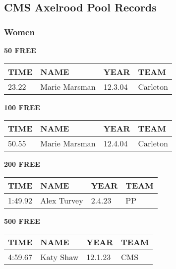 \vspace{0.4cm}

\newpage

\subsection{CMS Axelrood Pool Records}
\subsubsection{Women}

\begin{minipage}[t]{0.48\textwidth}
\centering
\textbf{50 FREE}\\[0.05cm]
\begin{tabular}{@{}p{1.8cm}p{2.8cm}p{1.2cm}p{1.4cm}@{}}
\hline
\textbf{TIME} & \textbf{NAME} & \textbf{YEAR} & \textbf{TEAM} \\
\hline
23.22 & Marie Marsman & 12.3.04 & Carleton \\
\hline
\end{tabular}
\end{minipage}\hfill
\begin{minipage}[t]{0.48\textwidth}
\centering
\textbf{100 FREE}\\[0.05cm]
\begin{tabular}{@{}p{1.8cm}p{2.8cm}p{1.2cm}p{1.4cm}@{}}
\hline
\textbf{TIME} & \textbf{NAME} & \textbf{YEAR} & \textbf{TEAM} \\
\hline
50.55 & Marie Marsman & 12.4.04 & Carleton \\
\hline
\end{tabular}
\end{minipage}

\vspace{0.4cm}

\begin{minipage}[t]{0.48\textwidth}
\centering
\textbf{200 FREE}\\[0.05cm]
\begin{tabular}{@{}p{1.8cm}p{2.8cm}p{1.2cm}p{1.4cm}@{}}
\hline
\textbf{TIME} & \textbf{NAME} & \textbf{YEAR} & \textbf{TEAM} \\
\hline
1:49.92 & Alex Turvey & 2.4.23 & PP \\
\hline
\end{tabular}
\end{minipage}\hfill
\begin{minipage}[t]{0.48\textwidth}
\centering
\textbf{500 FREE}\\[0.05cm]
\begin{tabular}{@{}p{1.8cm}p{2.8cm}p{1.2cm}p{1.4cm}@{}}
\hline
\textbf{TIME} & \textbf{NAME} & \textbf{YEAR} & \textbf{TEAM} \\
\hline
4:59.67 & Katy Shaw & 12.1.23 & CMS \\
\hline
\end{tabular}
\end{minipage}

